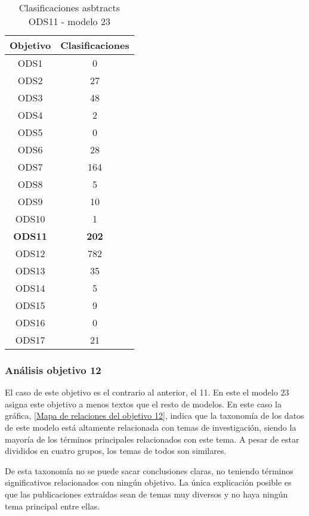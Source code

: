 \begin{table}[H]
    \begin{tabular}{| c | c |}
        \hline
        Objetivo & Clasificaciones \\
        \hline \hline
        ODS1   & 0   \\ \hline
        ODS2   & 27  \\ \hline
        ODS3   & 48  \\ \hline
        ODS4   & 2   \\ \hline
        ODS5   & 0   \\ \hline
        ODS6   & 28  \\ \hline
        ODS7   & 164 \\ \hline
        ODS8   & 5   \\ \hline
        ODS9   & 10  \\ \hline
        ODS10  & 1   \\ \hline
        \textbf{ODS11}  & \textbf{202} \\ \hline
        ODS12  & 782 \\ \hline
        ODS13  & 35  \\ \hline
        ODS14  & 5   \\ \hline
        ODS15  & 9   \\ \hline
        ODS16  & 0   \\ \hline
        ODS17  & 21  \\ \hline
    \end{tabular}
    \caption{Clasificaciones asbtracts ODS11 - modelo 23}
    \label{table:Clasificaciones asbtracts ODS11 - modelo 23}
\end{table}


\subsubsection{Análisis objetivo 12}
El caso de este objetivo es el contrario al anterior, el 11. En este el modelo
23 asigna este objetivo a menos textos que el resto de modelos. En este caso la
gráfica, \cref{Mapa de relaciones del objetivo 12}, indica que la taxonomía de los datos de
este modelo está altamente relacionada con temas de investigación, siendo la mayoría de los
términos principales relacionados con este tema. A pesar de estar divididos en
cuatro grupos, los temas de todos son similares. 

De esta taxonomía no se puede sacar conclusiones claras, no teniendo términos
significativos relacionados con ningún objetivo. La única explicación posible es
que las publicaciones extraídas sean de temas muy diversos y no haya ningún
tema principal entre ellas.

